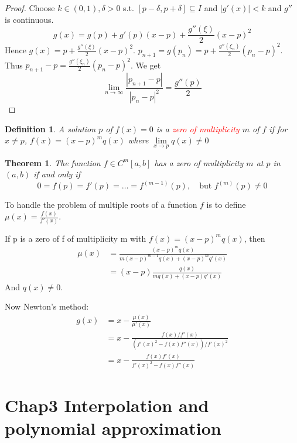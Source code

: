 \documentclass[11pt]{article}
\newtheorem{theorem}{Theorem}[section]
\newtheorem{definition}{Definition}[section]
\begin{document}
\begin{proof}
Choose $k\in(0,1),\delta>0$ s.t. $[p-\delta,p+\delta]\subseteq I$ and
$|g'(x)|<k$ and $g''$ is continuous.
\begin{equation*}
g(x)=g(p)+g'(p)(x-p)+\frac{g''(\xi)}{2}(x-p)^2
\end{equation*}
Hence $g(x)=p+\frac{g''(\xi)}{2}(x-p)^2$.
$p_{n+1}=g(p_n)=p+\frac{g''(\xi_n)}{2}(p_n-p)^2$. Thus
$p_{n+1}-p=\frac{g''(\xi_n)}{2}(p_n-p)^2$. We get
\begin{equation*}
\lim\limits_{n\to\infty}\frac{|p_{n+1}-p|}{|p_n-p|^2}=\frac{g''(p)}{2}
\end{equation*}
\end{proof}

\begin{definition}
A solution $p$ of $f(x) = 0$ is a \textcolor{red}{zero of multiplicity} $m$
of $f$ if for $x\neq p$, $f(x)=(x-p)^mq(x)$ where $\lim\limits_{x\to
p}q(x)\neq 0$
\end{definition}

\begin{theorem}
The function $f\in C^m[a,b]$ has a zero of multiplicity $m$ at $p$ in $(a,b)$
if and only if
\begin{equation*}
0=f(p)=f'(p)=\dots=f^{(m-1)}(p),\quad\text{but } f^{(m)}(p)\neq 0
\end{equation*}
\end{theorem}

To handle the problem of multiple roots of a function \(f\) is to define
\(\mu(x)=\frac{f(x)}{f'(x)}\).

If p is a zero of f of multiplicity m with \(f(x)=(x-p)^mq(x
)\), then
\begin{align*}
\mu(x)&=\frac{(x-p)^mq(x)}{m(x-p)^{m-1}q(x)+(x-p)^mq'(x)}\\
&=(x-p)\frac{q(x)}{mq(x)+(x-p)q'(x)}
\end{align*}
And \(q(x)\neq 0\).

Now Newton's method:
\begin{align*}
g(x)&=x-\frac{\mu(x)}{\mu'(x)}\\
&=x-\frac{f(x)/f'(x)}{(f'(x)^2-f(x)f''(x))/f'(x)^2}\\
&=x-\frac{f(x)f'(x)}{f'(x)^2-f(x)f''(x)}
\end{align*}
\section{Chap3 Interpolation and polynomial approximation}
\label{sec:org9666754}
\end{document}
